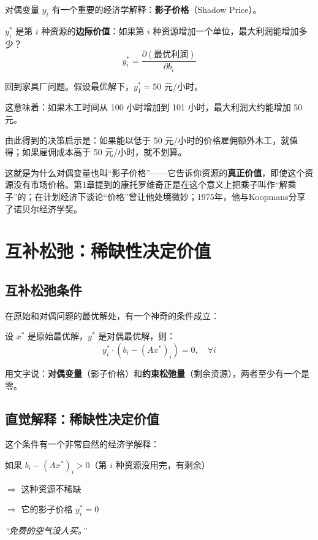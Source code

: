 对偶变量 $y_i$ 有一个重要的经济学解释：\textbf{影子价格}（Shadow Price）。

\begin{definition}[影子价格]
$y_i^*$ 是第 $i$ 种资源的\textbf{边际价值}：如果第 $i$ 种资源增加一个单位，最大利润能增加多少？
\[
y_i^* = \frac{\partial (\text{最优利润})}{\partial b_i}
\]
\end{definition}

\begin{example}[木工时间的价值]
回到家具厂问题。假设最优解下，$y_1^* = 50$ 元/小时。

这意味着：如果木工时间从 100 小时增加到 101 小时，最大利润大约能增加 50 元。

由此得到的决策启示是：如果能以低于 50 元/小时的价格雇佣额外木工，就值得；如果雇佣成本高于 50 元/小时，就不划算。
\end{example}

这就是为什么对偶变量也叫“影子价格”——它告诉你资源的\textbf{真正价值}，即使这个资源没有市场价格。第1章提到的康托罗维奇正是在这个意义上把乘子叫作“解乘子”的；在计划经济下谈论“价格”曾让他处境微妙；1975年，他与Koopmans分享了诺贝尔经济学奖。

\section{互补松弛：稀缺性决定价值}

\subsection{互补松弛条件}

在原始和对偶问题的最优解处，有一个神奇的条件成立：

\begin{keytheorem}[title=互补松弛条件]
设 $x^*$ 是原始最优解，$y^*$ 是对偶最优解，则：
\[
y_i^* \cdot (b_i - (Ax^*)_i) = 0, \quad \forall i
\]

用文字说：\textbf{对偶变量}（影子价格）和\textbf{约束松弛量}（剩余资源），两者至少有一个是零。
\end{keytheorem}

\subsection{直觉解释：稀缺性决定价值}

这个条件有一个非常自然的经济学解释：

\begin{tcolorbox}[colback=blue!5, colframe=blue!60!black, title=情况1：资源有剩余]
如果 $b_i - (Ax^*)_i > 0$（第 $i$ 种资源没用完，有剩余）

$\Rightarrow$ 这种资源不稀缺

$\Rightarrow$ 它的影子价格 $y_i^* = 0$

\vspace{0.2cm}
\textit{“免费的空气没人买。”}
\end{tcolorbox}

